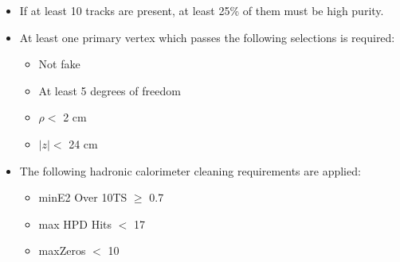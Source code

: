 \begin{itemize}
\item If at least 10 tracks are present, at least 25\% of them must be high purity.

\item At least one primary vertex which passes the following selections is required:
  \begin{itemize} 
  \item Not fake
  \item At least 5 degrees of freedom
  \item $\rho <$ 2 cm
  \item $|z| <$ 24 cm
 
  \end{itemize}

\item The following hadronic calorimeter cleaning requirements are applied:


  \begin{itemize} 
  \item minE2 Over 10TS $\ge$ 0.7
  \item max HPD Hits $<$ 17
  \item maxZeros $<$ 10
  \end{itemize}


\end{itemize}

